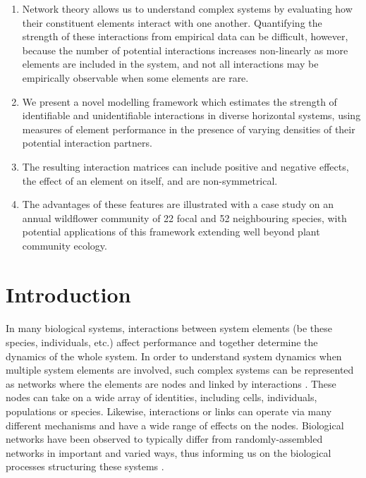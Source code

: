 \documentclass[a4,12pt]{article}
\begin{document}
    \begin{enumerate}
    \item{Network theory allows us to understand complex systems by evaluating how their constituent elements interact with one another. Quantifying the strength of these interactions from empirical data can be difficult, however, because the number of potential interactions increases non-linearly as more elements are included in the system, and not all interactions may be empirically observable when some elements are rare.}
    \item{We present a novel modelling framework which estimates the strength of identifiable and unidentifiable interactions in diverse horizontal systems, using measures of element performance in the presence of varying densities of their potential interaction partners.}
    \item{The resulting interaction matrices can include positive and negative effects, the effect of an element on itself, and are non-symmetrical.} 
    \item{The advantages of these features are illustrated with a case study on an annual wildflower community of 22 focal and 52 neighbouring species, with potential applications of this framework extending well beyond plant community ecology.}
\end{enumerate}

\section{Introduction}

    
    \paragraph{}
    In many biological systems, interactions between system elements (be these species, individuals, etc.) affect performance and together determine the dynamics of the whole system. In order to understand system dynamics when multiple system elements are involved, such complex systems can be represented as networks where the elements are nodes and linked by interactions \parencite{Pimm1978}. These nodes can take on a wide array of identities, including cells, individuals, populations or species. Likewise, interactions or links can operate via many different mechanisms and have a wide range of effects on the nodes. Biological networks have been observed to typically differ from randomly-assembled networks in important and varied ways, thus informing us on the biological processes structuring these systems \parencite{Dunne2002, Kinlock2019}.
\end{document}
